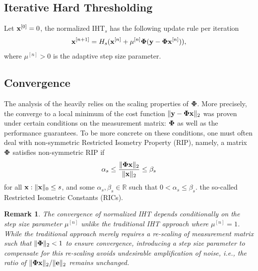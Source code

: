 \documentclass{article}
\newtheorem{remark}{Remark}
\begin{document}
\subsection{Iterative Hard Thresholding} 
Let ${\bf x}^{[0]} = 0$, the normalized IHT$_s$ has the following update rule per iteration
\begin{equation}\label{iht_update_rule}
{\bf x}^{[n+1]} = H_s({\bf x}^{[n]} + \mu^{[n]}{\bf \Phi}({\bf y}-{\bf \Phi}{\bf x}^{[n]})),
\end{equation}
where $\mu^{[n]}>0$ is the adaptive step size parameter. %

\subsection{Convergence} 
The analysis of the heavily relies on the scaling properties of ${\bf \Phi}$. More precisely, the converge to a local minimum of the cost function $\|{\bf y}-{\bf \Phi x} \|_2$ was proven under certain conditions on the measurement matrix: ${\bf \Phi}$ as well as the performance guarantees. To be more concrete on these conditions, one must often deal with non-symmetric Restricted Isometry Property (RIP), namely, a matrix ${\bf \Phi}$ satisfies non-symmetric RIP if
\begin{equation}\label{rip}
\alpha_{s} \leq \frac{\|{\bf \Phi} {\bf x}\|_2}{\|{\bf x}\|_2} \leq \beta_{s}
\end{equation}
for all ${\bf x}: \|{\bf x}\|_0 \leq s$, and some $\alpha_s, \beta_s \in \mathbb{R}$ such that $0<\alpha_s\leq \beta_s$. the so-called Restricted Isometric Constants (RICs).
\begin{remark}
The convergence of normalized IHT depends conditionally on the step size parameter $\mu^{[n]}$ unlike the traditional IHT approach where $\mu^{[n]}=1$. While the traditional approach merely requires a re-scaling of measurement matrix such that $\|{\bf \Phi}\|_2 <1$ to ensure convergence, introducing a step size parameter to compensate for this re-scaling avoids undesirable amplification of noise, i.e., the ratio of $\|{\bf \Phi x}\|_2/\|{\bf e}\|_2$ remains unchanged. 
\end{remark}
\end{document}

